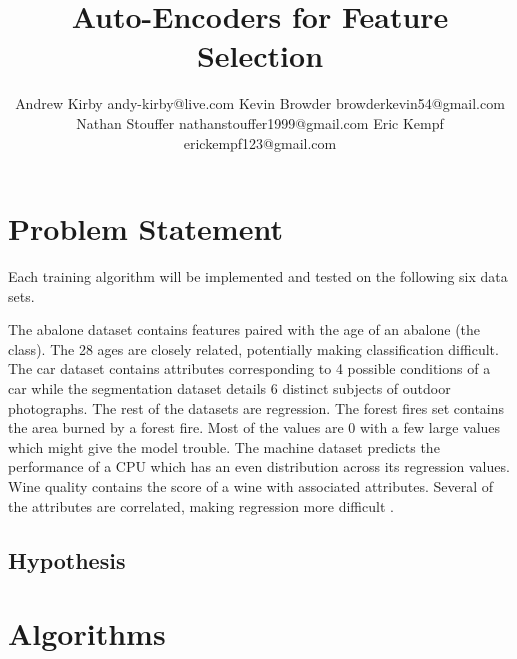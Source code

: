 \documentclass[twoside,11pt]{article}
\begin{document}
\title{Auto-Encoders for Feature Selection}

\author{\name Andrew Kirby \email andy-kirby@live.com \AND
		\name Kevin Browder \email browderkevin54@gmail.com \AND
		\name Nathan Stouffer \email nathanstouffer1999@gmail.com \AND
		\name Eric Kempf \email erickempf123@gmail.com }

\maketitle

\begin{abstract}

\end{abstract}

\section{Problem Statement}

	Each training algorithm will be implemented and tested on the following six data sets.
		
	The abalone dataset contains features paired with the age of an abalone (the class). The 28 ages are closely related, potentially making classification difficult.
	The car dataset contains attributes corresponding to 4 possible conditions of a car while the segmentation dataset details 6 distinct subjects of outdoor photographs.
	The rest of the datasets are regression.
	The forest fires set contains the area burned by a forest fire. Most of the values are 0 with a few large values which might give the model trouble.
	The machine dataset predicts the performance of a CPU which has an even distribution across its regression values. 
	Wine quality contains the score of a wine with associated attributes. Several of the attributes are correlated, making regression more difficult \citep{datasets}.

\subsection{Hypothesis}

\section{Algorithms}
\end{document}
